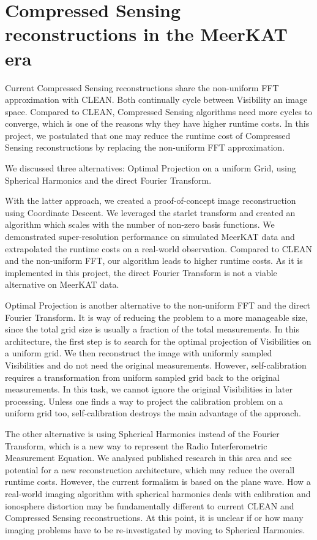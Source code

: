 \section{Compressed Sensing reconstructions in the MeerKAT era}
Current Compressed Sensing reconstructions share the non-uniform FFT approximation with CLEAN. Both continually cycle between Visibility an image space. Compared to CLEAN, Compressed Sensing algorithms need more cycles to converge, which is one of the reasons why they have higher runtime costs. In this project, we postulated that one may reduce the runtime cost of Compressed Sensing reconstructions by replacing the non-uniform FFT approximation. 

We discussed three alternatives: Optimal Projection on a uniform Grid, using Spherical Harmonics and the direct Fourier Transform. 

With the latter approach, we created a proof-of-concept image reconstruction using  Coordinate Descent. We leveraged the starlet transform and created an algorithm which scales with the number of non-zero basis functions. We demonstrated super-resolution performance on simulated MeerKAT data and extrapolated the runtime costs on a real-world observation. Compared to CLEAN and the non-uniform FFT, our algorithm leads to higher runtime costs. As it is implemented in this project, the direct Fourier Transform is not a viable alternative on MeerKAT data.

Optimal Projection is another alternative to the non-uniform FFT and the direct Fourier Transform. It is way of reducing the problem to a more manageable size, since the total grid size is usually a fraction of the total measurements. In this architecture, the first step is to search for the optimal projection of Visibilities on a uniform grid. We then reconstruct the image with uniformly sampled Visibilities and do not need the original measurements. However, self-calibration requires a transformation from uniform sampled grid back to the original measurements. In this task, we cannot ignore the original Visibilities in later processing. Unless one finds a way to project the calibration problem on a uniform grid too, self-calibration destroys the main advantage of the approach.

The other alternative is using Spherical Harmonics instead of the Fourier Transform, which is a new way to represent the Radio Interferometric Measurement Equation. We analysed published research in this area\cite{carozzi2015imaging, mcewen2008simulating} and see potential for a new reconstruction architecture, which may reduce the overall runtime costs. However, the current formalism\cite{smirnov2011revisiting} is based on the plane wave. How a real-world imaging algorithm with spherical harmonics deals with calibration and ionosphere distortion may be fundamentally different to current CLEAN and Compressed Sensing reconstructions. At this point, it is unclear if or how many imaging problems have to be re-investigated by moving to Spherical Harmonics.

